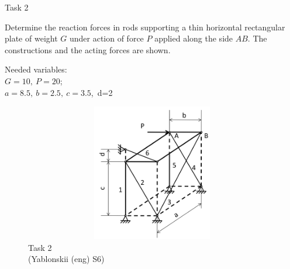 \documentclass[aspectratio=169]{beamer}
\newcommand{\fbckg}[1]{\usebackgroundtemplate{\texttt{[image: \#1]}}}%
\begin{document}
\begin{frame}[t]{Task 2}
  \begin{minipage}{0.6\textwidth}
    Determine  the  reaction  forces  in  rods  supporting  a  thin  horizontal  rectangular  plate  of  weight  $G$  under  action 
    of force $P$ applied along the side $AB$. The constructions and the acting forces are shown.
    
    Needed variables:\\
    $G=10,\ P=20$;\\
    $a=8.5,\ b=2.5,\ c=3.5$,\ d=2\\
  \end{minipage}
  \begin{minipage}{0.39\textwidth}
    \vspace*{-1cm}
    \begin{figure}[H]
      \centering\includegraphics[height=6cm,width=1\textwidth,keepaspectratio]{HW4_2}
      \caption*{Task 2\\ (Yablonskii (eng) S6)}
    \end{figure}
  \end{minipage}
\end{frame}

\fbckg{fibeamer/figs/last_page.png}
\frame[plain]{}
\end{document}
